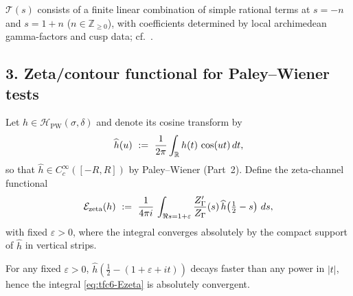 \begin{remark}\relax\hspace{0pt}
\label{rem:tfc6-trivial} %
$\mathcal{T}(s)$ consists of a finite linear combination of simple rational terms at $s=-n$ and $s=1+n$ ($n\in\mathbb{Z}_{\ge 0}$), with coefficients determined by local archimedean gamma-factors and cusp data; cf.\ \cite{HejhalII,Borthwick}. \relax\hspace{0pt}
\end{remark}

\subsection*{3. Zeta/contour functional for Paley--Wiener tests}\relax\hspace{0pt}
\label{subsec:tfc6-functional} %

Let $h\in\mathcal{H}_{\mathrm{PW}}(\sigma,\delta)$ and denote its cosine transform by
\begin{equation}\relax\hspace{0pt}
\label{eq:tfc6-hat}\relax\hspace{0pt}
\widehat{h}(u)\ :=\ \frac{1}{2\pi}\int_{\mathbb{R}} h(t)\,\cos(ut)\,dt,
\end{equation}
so that $\widehat{h}\in C_c^\infty([-R,R])$ by Paley--Wiener (Part~2). \relax\hspace{0pt}
Define the zeta-channel functional
\begin{equation}\relax\hspace{0pt}
\label{eq:tfc6-Ezeta}\relax\hspace{0pt}
\mathcal{E}_{\mathrm{zeta}}(h)\ :=\ \frac{1}{4\pi i}\,\int_{\Re s=1+\varepsilon}\frac{Z_\Gamma'}{Z_\Gamma}(s)\,\widehat{h}\!\left(\tfrac12-s\right)\,ds,
\end{equation}
with fixed $\varepsilon>0$, where the integral converges absolutely by the compact support of $\widehat{h}$ in vertical strips. \relax\hspace{0pt}

\begin{lemma}[Absolute convergence on $\Re s=1+\varepsilon$]\relax\hspace{0pt}
\label{lem:tfc6-abs}\relax\hspace{0pt}
For any fixed $\varepsilon>0$, $\widehat{h}\!\left(\tfrac12-(1+\varepsilon+it)\right)$ decays faster than any power in $|t|$, hence the integral \eqref{eq:tfc6-Ezeta} is absolutely convergent. \relax\hspace{0pt}
\end{lemma}

